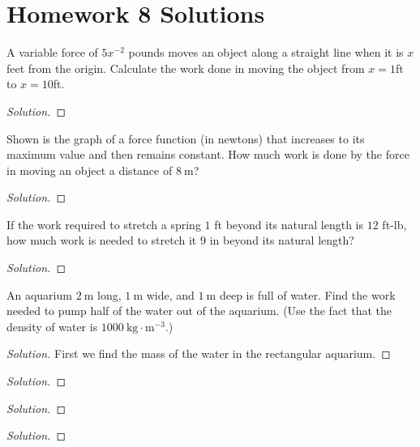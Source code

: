 \chapter{Homework 8 Solutions}
\begin{problem}
  A variable force of $5x^{-2}$ pounds moves an object along a straight
  line when it is $x$ feet from the origin. Calculate the work done in
  moving the object from $x=1$ft to $x=10$ft.
\end{problem}
\begin{proof}[Solution]
\end{proof}
\begin{problem}
  Shown is the graph of a force function (in newtons) that increases to its
  maximum value and then remains constant. How much work is done by the
  force in moving an object a distance of $\SI{8}{\meter}$?
\end{problem}
\begin{proof}[Solution]
\end{proof}
\begin{problem}
  If the work required to stretch a spring $1$ ft beyond its natural length
  is $12$ ft-lb, how much work is needed to stretch it $9$ in beyond its
  natural length?
\end{problem}
\begin{proof}[Solution]
\end{proof}
\begin{problem}
  An aquarium $\SI{2}{\meter}$ long, $\SI{1}{\meter}$ wide, and
  $\SI{1}{\meter}$ deep is full of water. Find the work needed to pump half
  of the water out of the aquarium. (Use the fact that the density of water
  is $\SI{1000}{\kilo\gram\cdot\meter^{-3}}$.)
\end{problem}
\begin{proof}[Solution]
First we find the mass of the water in the rectangular aquarium.
\end{proof}
\begin{problem}
\end{problem}
\begin{proof}[Solution]
\end{proof}
\begin{problem}
\end{problem}
\begin{proof}[Solution]
\end{proof}
\begin{problem}
\end{problem}
\begin{proof}[Solution]
\end{proof}

